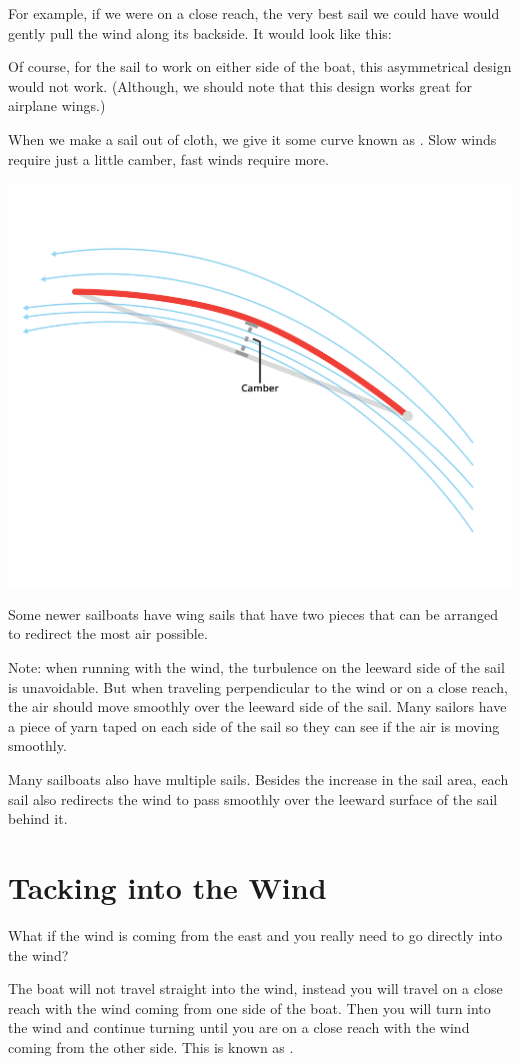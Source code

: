 For example,   if we were on a close reach,   the very best sail we could have would gently pull the wind along its backside.  It would look like this:

Of course,   for the sail to work on either side of the boat,  this asymmetrical design would not work.  (Although,  we should note that this design works great
for airplane wings.)

When we make a sail out of cloth,  we give it some curve known as .  Slow winds require just a little camber,  fast winds require more.

\includegraphics[width=.75\textwidth]{camber.png}


Some newer sailboats have wing sails that have two pieces that can be arranged to redirect the most air possible.

Note: when running with the wind,  the turbulence on the leeward side of the sail is unavoidable.   But when traveling perpendicular to the wind or on a close reach,  the air should move smoothly over the leeward side of the sail.   Many sailors have a piece of yarn taped on each side of the sail so they can see if the air is moving smoothly.

Many sailboats also have multiple sails.  Besides the increase in the sail area,  each sail also redirects the wind to pass smoothly over the leeward surface of the sail
behind it.

\section{Tacking into the Wind}

What if the wind is coming from the east and you really need to go directly into the wind?  

The boat will not travel straight into the wind,  instead you will travel on a close reach with the wind coming from one side of the boat.   Then you will turn into the wind and continue turning
until you are on a close reach with the wind coming from the other side.  This is known as .

